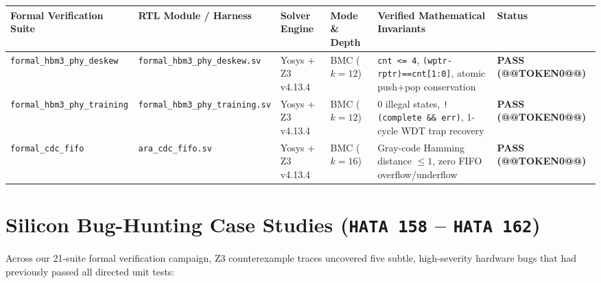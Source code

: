 \documentclass[journal,10pt,twocolumn]{IEEEtran}
\begin{document}
\begin{table}[htbp]
\centering\footnotesize
\begin{tabular}{p{} p{} p{} p{} p{} p{}}
\toprule
\textbf{Formal Verification Suite} & \textbf{RTL Module / Harness} & \textbf{Solver Engine} & \textbf{Mode \& Depth} & \textbf{Verified Mathematical Invariants} & \textbf{Status} \\
\midrule
\texttt{formal\_hbm3\_phy\_deskew} & \texttt{formal\_hbm3\_phy\_deskew.sv} & Yosys + Z3 v4.13.4 & BMC ($k=12$) & \texttt{cnt <= 4}, \texttt{(wptr-rptr)==cnt[1:0]}, atomic push+pop conservation & \textbf{PASS (@@TOKEN0@@)} \\
\texttt{formal\_hbm3\_phy\_training} & \texttt{formal\_hbm3\_phy\_training.sv} & Yosys + Z3 v4.13.4 & BMC ($k=12$) & 0 illegal states, \texttt{!(complete \&\& err)}, 1-cycle WDT trap recovery & \textbf{PASS (@@TOKEN0@@)} \\
\texttt{formal\_cdc\_fifo} & \texttt{ara\_cdc\_fifo.sv} & Yosys + Z3 v4.13.4 & BMC ($k=16$) & Gray-code Hamming distance $\le 1$, zero FIFO overflow/underflow & \textbf{PASS (@@TOKEN0@@)} \\
\bottomrule
\end{tabular}
\vspace{4pt}
\end{table}


\section{Silicon Bug-Hunting Case Studies (\texttt{HATA 158} – \texttt{HATA 162})}

Across our 21-suite formal verification campaign, Z3 counterexample traces uncovered five subtle, high-severity hardware bugs that had previously passed all directed unit tests:
\end{document}
